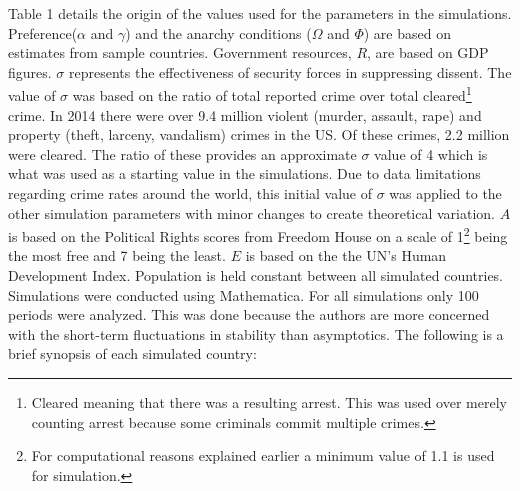 \documentclass[12pt]{article}
\begin{document}
\begin{spacing}{1.5}
Table 1 details the origin of the values used for the parameters in the simulations. Preference($\alpha$ and $\gamma$) and the anarchy conditions ($\Omega$ and $\Phi$) are based on estimates from sample countries. Government resources, $R$, are based on GDP figures. $\sigma$ represents the effectiveness of security forces in suppressing dissent. The value of $\sigma$ was based on the ratio of total reported crime over total cleared\footnote{Cleared meaning that there was a resulting arrest. This was used over merely counting arrest because some criminals commit multiple crimes.} crime. In 2014 there were over 9.4 million violent (murder, assault, rape) and property (theft, larceny, vandalism) crimes in the US. Of these crimes, 2.2 million were cleared. The ratio of these provides an approximate $\sigma$ value of 4 which is what was used as a starting value in the simulations. Due to data limitations regarding crime rates around the world, this initial value of $\sigma$ was applied to the other simulation parameters with minor changes to create theoretical variation. $A$ is based on the Political Rights scores from Freedom House on a scale of 1\footnote{For computational reasons explained earlier a minimum value of 1.1 is used for simulation.} being the most free and 7 being the least. $E$ is based on the the UN's Human Development Index. Population is held constant between all simulated countries. Simulations were conducted using Mathematica. For all simulations only 100 periods were analyzed. This was done because the authors are more concerned with the short-term fluctuations in stability than asymptotics. The following is a brief synopsis of each simulated country:  



\end{spacing}
\end{document}
